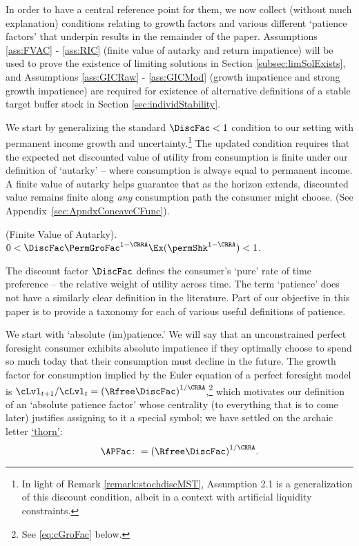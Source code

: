 \documentclass[BufferStockTheory]{subfiles}
\begin{document}
In order to have a central reference point for them, we now collect (without much explanation) conditions relating to growth factors and various different `patience factors' that underpin results in the remainder of the paper.
Assumptions \ref{ass:FVAC} - \ref{ass:RIC}  (finite value of autarky and return impatience) will be used to prove the existence of limiting solutions in Section \ref{subsec:limSolExists}, and Assumptions \ref{ass:GICRaw} - \ref{ass:GICMod} (growth impatience and strong growth impatience) are required for existence of alternative definitions of a stable target buffer stock in Section \ref{sec:individStability}.


We start by generalizing the standard $\DiscFac<1$ condition to our setting with permanent income growth and uncertainty.\footnote{In light of Remark \ref{remark:stochdiscMST}, \cite{mstIncFluct} Assumption 2.1 is a generalization of this discount condition, albeit in a context with artificial liquidity constraints.} The updated condition requires that the expected net discounted value of utility from consumption is finite under our definition of `autarky' -- where consumption is always equal to permanent income.
A finite value of autarky helps guarantee that as the horizon extends, discounted value remains finite along \textit{any} consumption path the consumer might choose.
(See Appendix~\ref{sec:ApndxConcaveCFunc}).



\hypertarget{FVAC}{}
\begin{assumL}\label{ass:FVAC}(Finite Value of Autarky). 
%
$0 < \DiscFac \PermGroFac^{1-\CRRA}\Ex(\permShk^{1-\CRRA}) < 1 $.
%
\end{assumL}

The discount factor $\DiscFac$ defines the consumer's `pure' rate of time preference -- the relative weight of utility across time.
The term `patience' does not have a similarly clear definition in the literature.
Part of our objective in this paper is to provide a taxonomy for each of various useful definitions of patience.

We start with `absolute (im)patience.'
We will say that an unconstrained perfect foresight consumer exhibits absolute impatience if they optimally choose to spend so much today that their consumption must decline in the future.
The growth factor for consumption implied by the Euler equation of a perfect foresight model is $\cLvl_{t+1}/\cLvl_{t} = {(\Rfree\DiscFac)}^{1/\CRRA}$,\footnote{See \eqref{eq:cGroFac} below.} which motivates our definition of an `absolute patience factor' whose centrality (to everything that is to come later) justifies assigning to it a special symbol; we have settled on the archaic letter \href{https://en.wikipedia.org/wiki/Thorn_(letter)}{`thorn'}:
\hypertarget{APFAC}{}
\begin{equation}\label{eq:APFac}
    \APFac \colon= {(\Rfree\DiscFac)}^{1/\CRRA}.
\end{equation}
\end{document}
